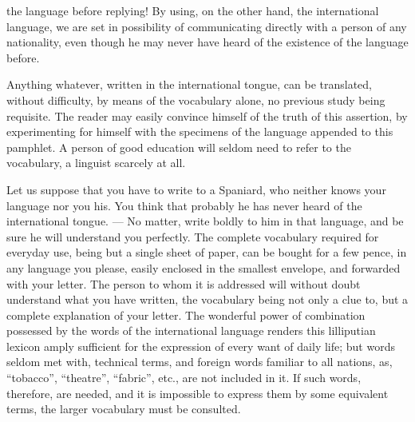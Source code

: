 the language before replying! By using, on the other hand, the international language, we are set in possibility of communicating directly with a person of any nationality, even though he may never have heard of the existence of the language before.

Anything whatever, written in the international tongue, can be translated, without difficulty, by means of the vocabulary alone, no previous study being requisite. The reader may easily convince himself of the truth of this assertion, by experimenting for himself with the specimens of the language appended to this pamphlet. A person of good education will seldom need to refer to the vocabulary, a linguist scarcely at all.

Let us suppose that you have to write to a Spaniard, who neither knows your language nor you his. You think that probably he has never heard of the international tongue. --- No matter, write boldly to him in that language, and be sure he will understand you perfectly. The complete vocabulary required for everyday use, being but a single sheet of paper, can be bought for a few pence, in any language you please, easily enclosed in the smallest envelope, and forwarded with your letter. The person to whom it is addressed will without doubt understand what you have written, the vocabulary being not only a clue to, but a complete explanation of your letter. The wonderful power of combination possessed by the words of the international language renders this lilliputian lexicon amply sufficient for the expression of every want of daily life; but words seldom met with, technical terms, and foreign words familiar to all nations, as, “tobacco”, “theatre”, “fabric”, etc., are not included in it. If such words, therefore, are needed, and it is impossible to express them by some equivalent terms, the larger vocabulary must be consulted.

